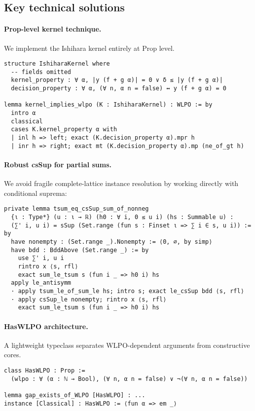 \documentclass{lmcs}
\begin{document}
\subsection{Key technical solutions}

\paragraph{Prop-level kernel technique.}
We implement the Ishihara kernel entirely at Prop level.

\begin{lstlisting}[caption={Ishihara kernel (illustrative Lean snippet)}]
structure IshiharaKernel where
  -- fields omitted
  kernel_property : ∀ α, |y (f + g α)| = 0 ∨ δ ≤ |y (f + g α)|
  decision_property : ∀ α, (∀ n, α n = false) ↔ y (f + g α) = 0

lemma kernel_implies_wlpo (K : IshiharaKernel) : WLPO := by
  intro α
  classical
  cases K.kernel_property α with
  | inl h => left; exact (K.decision_property α).mpr h
  | inr h => right; exact mt (K.decision_property α).mp (ne_of_gt h)
\end{lstlisting}

\paragraph{Robust csSup for partial sums.}
We avoid fragile complete-lattice instance resolution by working directly with conditional suprema:
\begin{lstlisting}[caption={tsum equals csSup of finite partial sums}]
private lemma tsum_eq_csSup_sum_of_nonneg
  {ι : Type*} (u : ι → ℝ) (h0 : ∀ i, 0 ≤ u i) (hs : Summable u) :
  (∑' i, u i) = sSup (Set.range (fun s : Finset ι => ∑ i ∈ s, u i)) := by
  have nonempty : (Set.range _).Nonempty := ⟨0, ∅, by simp⟩
  have bdd : BddAbove (Set.range _) := by
    use ∑' i, u i
    rintro x ⟨s, rfl⟩
    exact sum_le_tsum s (fun i _ => h0 i) hs
  apply le_antisymm
  · apply tsum_le_of_sum_le hs; intro s; exact le_csSup bdd ⟨s, rfl⟩
  · apply csSup_le nonempty; rintro x ⟨s, rfl⟩
    exact sum_le_tsum s (fun i _ => h0 i) hs
\end{lstlisting}

\paragraph{HasWLPO architecture.}
A lightweight typeclass separates WLPO-dependent arguments from constructive cores.

\begin{lstlisting}[caption={WLPO typeclass sketch}]
class HasWLPO : Prop :=
  (wlpo : ∀ (α : ℕ → Bool), (∀ n, α n = false) ∨ ¬(∀ n, α n = false))

lemma gap_exists_of_WLPO [HasWLPO] : ...
instance [Classical] : HasWLPO := ⟨fun α => em _⟩
\end{lstlisting}
\end{document}

